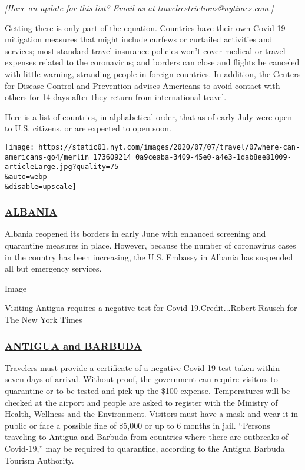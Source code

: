 \emph{{[}Have an update for this list? Email us at}
\href{mailto:travelrestrictions@nytimes.com}{\emph{travelrestrictions@nytimes.com}}\emph{.{]}}

Getting there is only part of the equation. Countries have their own
\href{https://www.nytimes.com/2020/07/16/travel/virus-vacation.html}{Covid-19}
mitigation measures that might include curfews or curtailed activities
and services; most standard travel insurance policies won't cover
medical or travel expenses related to the coronavirus; and borders can
close and flights be canceled with little warning, stranding people in
foreign countries. In addition, the Centers for Disease Control and
Prevention
\href{https://www.cdc.gov/coronavirus/2019-ncov/travelers/after-travel-precautions.html}{advises}
Americans to avoid contact with others for 14 days after they return
from international travel.

Here is a list of countries, in alphabetical order, that as of early
July were open to U.S. citizens, or are expected to open soon.

\texttt{[image: https://static01.nyt.com/images/2020/07/07/travel/07where-can-americans-go4/merlin\_173609214\_0a9ceaba-3409-45e0-a4e3-1dab8ee81009-articleLarge.jpg?quality=75\\\&auto=webp\\\&disable=upscale]}

\hypertarget{albania}{%
\subsubsection{\texorpdfstring{\href{https://al.usembassy.gov/updates_covid19/}{ALBANIA}}{ALBANIA}}\label{albania}}

Albania reopened its borders in early June with enhanced screening and
quarantine measures in place. However, because the number of coronavirus
cases in the country has been increasing, the U.S. Embassy in Albania
has suspended all but emergency services.

Image

Visiting Antigua requires a negative test for Covid-19.Credit...Robert
Rausch for The New York Times

\hypertarget{antigua-and-barbuda}{%
\subsubsection{\texorpdfstring{\href{https://visitantiguabarbuda.com/travel-advisory/}{ANTIGUA
and BARBUDA}}{ANTIGUA and BARBUDA}}\label{antigua-and-barbuda}}

Travelers must provide a certificate of a negative Covid-19 test taken
within seven days of arrival. Without proof, the government can require
visitors to quarantine or to be tested and pick up the \$100 expense.
Temperatures will be checked at the airport and people are asked to
register with the Ministry of Health, Wellness and the Environment.
Visitors must have a mask and wear it in public or face a possible fine
of \$5,000 or up to 6 months in jail. ``Persons traveling to Antigua and
Barbuda from countries where there are outbreaks of Covid-19,'' may be
required to quarantine, according to the Antigua Barbuda Tourism
Authority.

